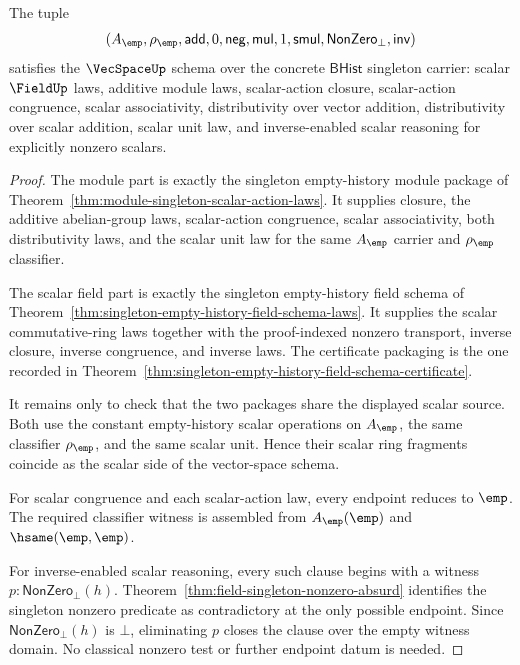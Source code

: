 \begin{theorem}
\label{thm:singleton-empty-history-vecspace-laws}
The tuple
$$
(A_{\emp},\rho_{\emp},\mathsf{add},0,\mathsf{neg},
\mathsf{mul},1,\mathsf{smul},\mathsf{NonZero}_{\bot},\mathsf{inv})
$$
satisfies the $\VecSpaceUp$ schema over the concrete $\mathsf{BHist}$
singleton carrier:
scalar $\FieldUp$ laws, additive module laws, scalar-action closure,
scalar-action congruence, scalar associativity, distributivity over vector
addition, distributivity over scalar addition, scalar unit law, and
inverse-enabled scalar reasoning for explicitly nonzero scalars.
\end{theorem}
\begin{proof}
The module part is exactly the singleton empty-history module package of
Theorem~\ref{thm:module-singleton-scalar-action-laws}. It supplies closure,
the additive abelian-group laws, scalar-action congruence, scalar
associativity, both distributivity laws, and the scalar unit law for the same
$A_{\emp}$ carrier and $\rho_{\emp}$ classifier.

The scalar field part is exactly the singleton empty-history field schema of
Theorem~\ref{thm:singleton-empty-history-field-schema-laws}. It supplies the
scalar commutative-ring laws together with the proof-indexed nonzero transport,
inverse closure, inverse congruence, and inverse laws. The certificate
packaging is the one recorded in
Theorem~\ref{thm:singleton-empty-history-field-schema-certificate}.

It remains only to check that the two packages share the displayed scalar
source. Both use the constant empty-history scalar operations on
$A_{\emp}$, the same classifier $\rho_{\emp}$, and the same scalar unit. Hence
their scalar ring fragments coincide as the scalar side of the vector-space
schema.

For scalar congruence and each scalar-action law, every endpoint reduces to
$\emp$. The required classifier witness is assembled from
$A_{\emp}(\emp)$ and $\hsame(\emp,\emp)$.

For inverse-enabled scalar reasoning, every such clause begins with a witness
$p:\mathsf{NonZero}_{\bot}(h)$. Theorem~\ref{thm:field-singleton-nonzero-absurd}
identifies the singleton nonzero predicate as contradictory at the only
possible endpoint. Since
$\mathsf{NonZero}_{\bot}(h)$ is $\bot$, eliminating $p$ closes the clause over
the empty witness domain. No classical nonzero test or further endpoint datum
is needed.
\end{proof}

